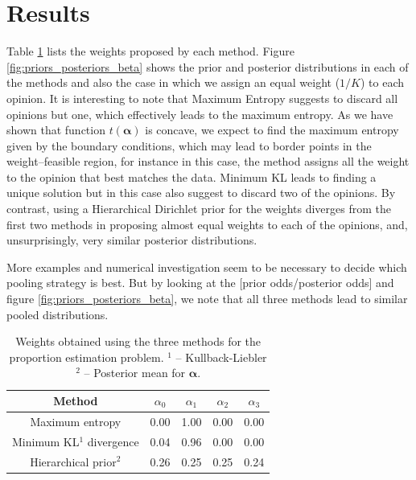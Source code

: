 \documentclass[a4paper, notitlepage, 10pt]{article}
\begin{document}
\section*{Results}

Table \ref{tab:alphasBeta} lists the weights proposed by each method. Figure \ref{fig:priors_posteriors_beta} shows the prior and posterior distributions in each of the methods and also the case in which we assign an equal weight ($1/K$) to each opinion. It is interesting to note that Maximum Entropy suggests to discard all opinions but one, which effectively leads to the maximum entropy.  As we have shown that function $t(\boldsymbol\alpha)$ is concave, we expect to find the maximum entropy given by the boundary conditions, which may lead to border points in the weight--feasible region, for instance in this case, the method assigns all the weight to the opinion that best matches the data.
Minimum KL leads to finding a unique solution but in this case also suggest to discard two of the opinions.
By contrast, using a Hierarchical Dirichlet prior for the weights 
diverges from the first two methods in proposing almost equal weights to each of the opinions, and, unsurprisingly, very similar posterior distributions.

More examples and numerical investigation seem to be necessary to decide which 
pooling strategy is best. But by looking at the [prior odds/posterior odds] and 
figure \ref{fig:priors_posteriors_beta}, we note that all three methods lead 
to similar pooled distributions.
\begin{table}[ht]
\caption{Weights obtained using the three methods for the proportion estimation problem. $^1$ -- Kullback-Liebler $^2$ -- Posterior mean for $\boldsymbol\alpha$.}
\centering
\begin{tabular}{ccccc}
  \hline
Method  & $\alpha_0$ & $\alpha_1$ & $\alpha_2$ & $\alpha_3$ \\ 
  \hline
Maximum entropy & 0.00 & 1.00 & 0.00 & 0.00 \\ 
Minimum KL$^1$ divergence& 0.04 & 0.96 & 0.00 & 0.00 \\ 
Hierarchical prior$^2$ & 0.26 & 0.25 & 0.25 & 0.24 \\ 
   \hline
\end{tabular}
\label{tab:alphasBeta}
\end{table}
\end{document}
